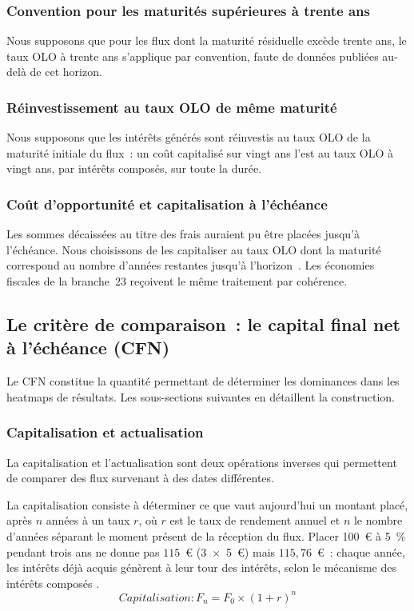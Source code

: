 ﻿\documentclass[12pt, a4paper]{article}
\begin{document}
\subsubsection*{Convention pour les maturités supérieures à trente ans}
Nous supposons que pour les flux dont la maturité résiduelle excède trente ans,
le taux OLO à trente ans s'applique par convention, faute de données publiées
au-delà de cet horizon.

\subsubsection*{Réinvestissement au taux OLO de même maturité}
Nous supposons que les intérêts générés sont réinvestis au taux OLO de la
maturité initiale du flux~: un coût capitalisé sur vingt ans l'est au taux
OLO à vingt ans, par intérêts composés, sur toute la durée.

\subsubsection*{Coût d'opportunité et capitalisation à l'échéance}
Les sommes décaissées au titre des frais auraient pu être placées jusqu'à l'échéance. 
Nous choisissons de les capitaliser au taux OLO dont la maturité correspond au nombre
d'années restantes jusqu'à l'horizon~\cite[p.~149-150]{berk2020}. Les économies
fiscales de la branche~23 reçoivent le même traitement par cohérence.

\subsection{Le critère de comparaison~: le capital final net à l'échéance (CFN)}

Le CFN constitue la quantité
permettant de déterminer les dominances
dans les heatmaps de résultats. Les sous-sections
suivantes en détaillent la construction.

\subsubsection*{Capitalisation et actualisation}

La capitalisation et l'actualisation sont deux opérations inverses qui
permettent de comparer des flux survenant à des dates différentes.

La capitalisation consiste à déterminer ce que vaut aujourd'hui 
un montant placé, après $n$ années à un taux $r$, 
où $r$ est le taux de rendement annuel et $n$ le nombre d'années séparant le moment présent
de la réception du flux.
Placer 100~€ à 5~\% pendant trois ans ne donne pas $115$~€ (3~$\times$~5~€) 
mais $115{,}76$~€~: chaque année, les intérêts déjà acquis génèrent à leur tour 
des intérêts, selon le mécanisme des intérêts composés \cite[p.~95-96]{berk2020}.
\begin{equation}
  Capitalisation : F_n = F_0 \times (1 + r)^n
\end{equation}
\end{document}
